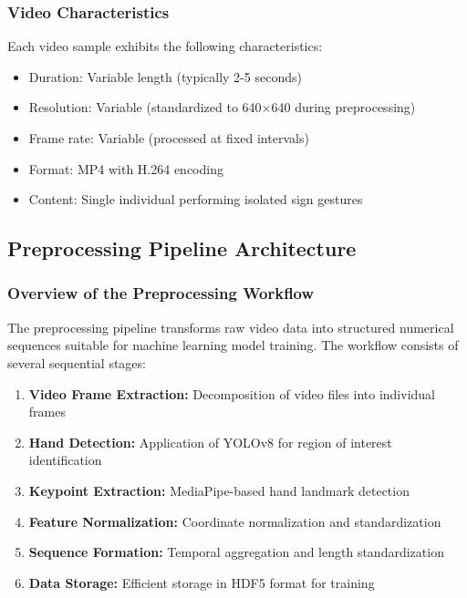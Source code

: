 \documentclass[11pt, a4paper]{article}
\begin{document}
\subsubsection{Video Characteristics}

Each video sample exhibits the following characteristics:
\begin{itemize}
    \item Duration: Variable length (typically 2-5 seconds)
    \item Resolution: Variable (standardized to 640×640 during preprocessing)
    \item Frame rate: Variable (processed at fixed intervals)
    \item Format: MP4 with H.264 encoding
    \item Content: Single individual performing isolated sign gestures
\end{itemize}

\subsection{Preprocessing Pipeline Architecture}

\subsubsection{Overview of the Preprocessing Workflow}

The preprocessing pipeline transforms raw video data into structured numerical sequences suitable for machine learning model training. The workflow consists of several sequential stages:

\begin{enumerate}
    \item \textbf{Video Frame Extraction:} Decomposition of video files into individual frames
    \item \textbf{Hand Detection:} Application of YOLOv8 for region of interest identification
    \item \textbf{Keypoint Extraction:} MediaPipe-based hand landmark detection
    \item \textbf{Feature Normalization:} Coordinate normalization and standardization
    \item \textbf{Sequence Formation:} Temporal aggregation and length standardization
    \item \textbf{Data Storage:} Efficient storage in HDF5 format for training
\end{enumerate}
\end{document}
